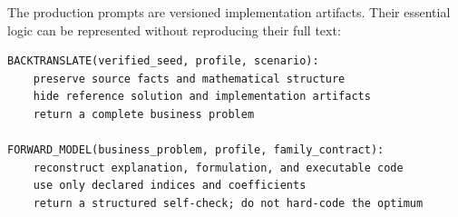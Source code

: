 
The production prompts are versioned implementation artifacts.  Their essential
logic can be represented without reproducing their full text:

\begin{lstlisting}[style=orcptappendix,caption={Abstract prompt interface used by the bidirectional synthesis stage.}]
BACKTRANSLATE(verified_seed, profile, scenario):
    preserve source facts and mathematical structure
    hide reference solution and implementation artifacts
    return a complete business problem

FORWARD_MODEL(business_problem, profile, family_contract):
    reconstruct explanation, formulation, and executable code
    use only declared indices and coefficients
    return a structured self-check; do not hard-code the optimum
\end{lstlisting}

